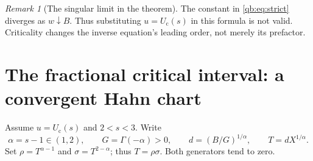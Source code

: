 \documentclass[11pt,a4paper]{article}
\theoremstyle{definition}\newtheorem{definition}[theorem]{Definition}
\theoremstyle{remark}\newtheorem{remark}[theorem]{Remark}
\newcommand{\Uc}{U_{\mathrm c}}
\numberwithin{equation}{section}
\begin{document}
\begin{remark}[The singular limit in the theorem]
The constant in \eqref{qb:eq:strict} diverges as $w\downarrow B$.
Thus substituting $u=\Uc(s)$ in this formula is not valid. Criticality
changes the inverse equation's leading order, not merely its prefactor.
\end{remark}

\section{The fractional critical interval: a convergent Hahn chart}
\label{qb:sec:stable}

Assume $u=\Uc(s)$ and $2<s<3$. Write
\begin{equation}\label{qb:eq:stable-constants}
 \alpha=s-1\in(1,2),\qquad G=\Gamma(-\alpha)>0,\qquad
 d=(B/G)^{1/\alpha},\qquad T=dX^{1/\alpha}.
\end{equation}
Set $\rho=T^{\alpha-1}$ and $\sigma=T^{2-\alpha}$; thus
$T=\rho\sigma$. Both generators tend to zero.
\end{document}
